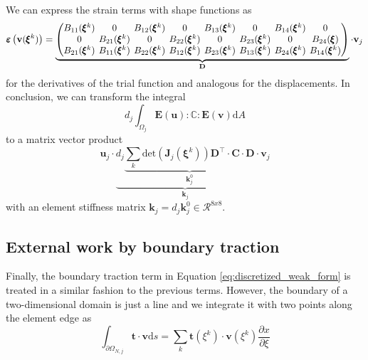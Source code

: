 We can express the strain terms with shape functions as 
\begin{equation}
    \pmb{\varepsilon}\left(\mathbf{v}(\pmb{\xi}^k)\right)
    =
    \underbrace{
    \begingroup 
    \setlength\arraycolsep{2pt}
    \begin{pmatrix}
            B_{11}(\pmb{\xi}^k) & 0 & B_{12}(\pmb{\xi}^k) & 0 & B_{13}(\pmb{\xi}^k) & 0 & B_{14}(\pmb{\xi}^k) & 0\\
            0 & B_{21}(\pmb{\xi}^k) & 0 & B_{22}(\pmb{\xi}^k) & 0 & B_{23}(\pmb{\xi}^k) & 0 & B_{24}(\pmb{\xi})\\
            B_{21}(\pmb{\xi}^k) & B_{11}(\pmb{\xi}^k) & B_{22}(\pmb{\xi}^k) & B_{12}(\pmb{\xi}^k) & B_{23}(\pmb{\xi}^k) & B_{13}(\pmb{\xi}^k) & B_{24}(\pmb{\xi}^k) & B_{14}(\pmb{\xi}^k)\\
    \end{pmatrix} 
    \endgroup
    }_{\mathbf{D}}
    \cdot 
    \mathbf{v}_j
\end{equation}
for the derivatives of the trial function and analogous for the displacements. In conclusion, we can transform the integral 
\begin{equation}
    d_j \int_{\Omega_j} \mathbf{E}(\mathbf{u}) : \mathbb{C} :  \mathbf{E}(\mathbf{v}) \text{d}A 
\end{equation}
to a matrix vector product 
\begin{equation}
    \mathbf{u}_j \cdot 
    \underbrace{
    d_j 
    \underbrace{ 
    \sum_k \text{det}\left(\mathbf{J}_j(\pmb{\xi}^k)\right)\mathbf{D}^\top \cdot \mathbf{C} \cdot \mathbf{D}}_{\mathbf{k}^0_j}
    }_{\mathbf{k}_j}
    \cdot \mathbf{v}_j
\end{equation}
with an element stiffness matrix $\mathbf{k}_j = d_j  \mathbf{k}^0_j \in \mathcal{R}^{8x8}$. 

\subsection{External work by boundary traction}
Finally, the boundary traction term in Equation \eqref{eq:discretized_weak_form} is treated in a similar fashion to the previous terms. However, the boundary of a two-dimensional domain is just a line and we integrate it with two points along the element edge as 
\begin{equation}
    \int_{\partial \Omega_{N,j}} \mathbf{t} \cdot \mathbf{v} \text{d}s
    =
    \sum_k \mathbf{t}(\xi^k) \cdot \mathbf{v}(\xi^k) \frac{\partial x}{\partial \xi} 
\end{equation}

